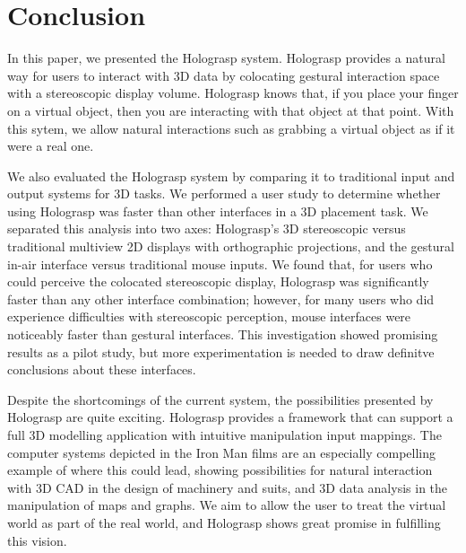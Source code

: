 \documentclass[pageno]{jpaper}
\begin{document}
\section{Conclusion}
In this paper, we presented the Holograsp system. Holograsp provides a natural way for users to interact with 3D data by colocating gestural interaction
space with a stereoscopic display volume. Holograsp knows that, if you place your finger on a virtual object, then you are interacting with that object at
that point. With this sytem, we allow natural interactions such as grabbing a virtual object as if it were a real one.

We also evaluated the Holograsp system by comparing it to traditional input and output systems for 3D tasks. We performed a user study to determine whether
using Holograsp was faster than other interfaces in a 3D placement task. We separated this analysis into two axes: Holograsp's 3D stereoscopic
versus traditional multiview 2D displays with orthographic projections, and the gestural in-air interface versus traditional mouse inputs. We
found that, for users who could perceive the colocated stereoscopic display, Holograsp was significantly faster than any other interface combination;
however, for many users who did experience difficulties with stereoscopic perception, mouse interfaces were noticeably faster than gestural interfaces.
This investigation showed promising results as a pilot study, but more experimentation is needed to draw definitve conclusions about these interfaces.

Despite the shortcomings of the current system, the possibilities presented by Holograsp are quite exciting. Holograsp provides a framework that
can support a full 3D modelling application with intuitive manipulation input mappings. The computer systems depicted in the Iron Man films are
an especially compelling example of where this could lead, showing possibilities for natural interaction with 3D CAD in the design of machinery
and suits, and 3D data analysis in the manipulation of maps and graphs. We aim to allow the user to treat the virtual world as part of the real
world, and Holograsp shows great promise in fulfilling this vision.

\newpage
{}


\end{document}
